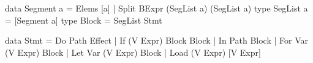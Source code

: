 \documentclass[letterpaper,10pt,onecolumn]{article}
\begin{document}
\begin{program}
data Segment a = Elems [a] | Split BExpr (SegList a) (SegList a)
type SegList a = [Segment a]
type Block = SegList Stmt

data Stmt
     = Do Path Effect
     | If (V Expr) Block Block
     | In Path Block
     | For Var (V Expr) Block
     | Let Var (V Expr) Block
     | Load (V Expr) [V Expr]
\end{program}




\end{document}
